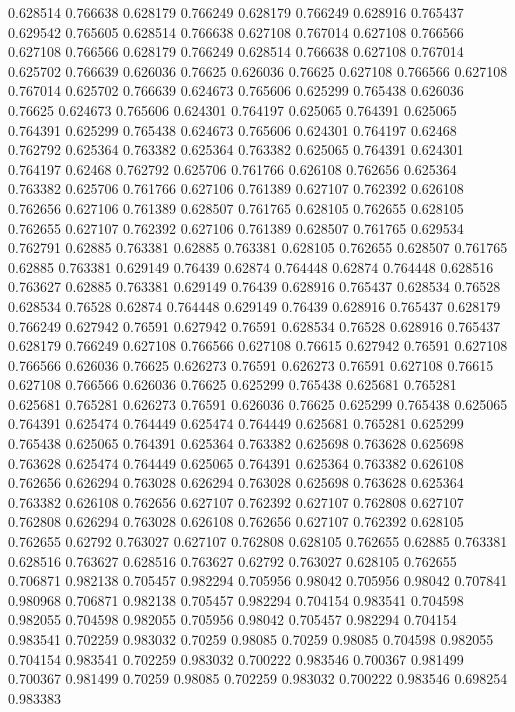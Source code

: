 0.628514 0.766638
0.628179 0.766249
0.628179 0.766249
0.628916 0.765437
0.629542 0.765605
0.628514 0.766638
0.627108 0.767014
0.627108 0.766566
0.627108 0.766566
0.628179 0.766249
0.628514 0.766638
0.627108 0.767014
0.625702 0.766639
0.626036 0.76625
0.626036 0.76625
0.627108 0.766566
0.627108 0.767014
0.625702 0.766639
0.624673 0.765606
0.625299 0.765438
0.626036 0.76625
0.624673 0.765606
0.624301 0.764197
0.625065 0.764391
0.625065 0.764391
0.625299 0.765438
0.624673 0.765606
0.624301 0.764197
0.62468 0.762792
0.625364 0.763382
0.625364 0.763382
0.625065 0.764391
0.624301 0.764197
0.62468 0.762792
0.625706 0.761766
0.626108 0.762656
0.625364 0.763382
0.625706 0.761766
0.627106 0.761389
0.627107 0.762392
0.626108 0.762656
0.627106 0.761389
0.628507 0.761765
0.628105 0.762655
0.628105 0.762655
0.627107 0.762392
0.627106 0.761389
0.628507 0.761765
0.629534 0.762791
0.62885 0.763381
0.62885 0.763381
0.628105 0.762655
0.628507 0.761765
0.62885 0.763381
0.629149 0.76439
0.62874 0.764448
0.62874 0.764448
0.628516 0.763627
0.62885 0.763381
0.629149 0.76439
0.628916 0.765437
0.628534 0.76528
0.628534 0.76528
0.62874 0.764448
0.629149 0.76439
0.628916 0.765437
0.628179 0.766249
0.627942 0.76591
0.627942 0.76591
0.628534 0.76528
0.628916 0.765437
0.628179 0.766249
0.627108 0.766566
0.627108 0.76615
0.627942 0.76591
0.627108 0.766566
0.626036 0.76625
0.626273 0.76591
0.626273 0.76591
0.627108 0.76615
0.627108 0.766566
0.626036 0.76625
0.625299 0.765438
0.625681 0.765281
0.625681 0.765281
0.626273 0.76591
0.626036 0.76625
0.625299 0.765438
0.625065 0.764391
0.625474 0.764449
0.625474 0.764449
0.625681 0.765281
0.625299 0.765438
0.625065 0.764391
0.625364 0.763382
0.625698 0.763628
0.625698 0.763628
0.625474 0.764449
0.625065 0.764391
0.625364 0.763382
0.626108 0.762656
0.626294 0.763028
0.626294 0.763028
0.625698 0.763628
0.625364 0.763382
0.626108 0.762656
0.627107 0.762392
0.627107 0.762808
0.627107 0.762808
0.626294 0.763028
0.626108 0.762656
0.627107 0.762392
0.628105 0.762655
0.62792 0.763027
0.627107 0.762808
0.628105 0.762655
0.62885 0.763381
0.628516 0.763627
0.628516 0.763627
0.62792 0.763027
0.628105 0.762655
0.706871 0.982138
0.705457 0.982294
0.705956 0.98042
0.705956 0.98042
0.707841 0.980968
0.706871 0.982138
0.705457 0.982294
0.704154 0.983541
0.704598 0.982055
0.704598 0.982055
0.705956 0.98042
0.705457 0.982294
0.704154 0.983541
0.702259 0.983032
0.70259 0.98085
0.70259 0.98085
0.704598 0.982055
0.704154 0.983541
0.702259 0.983032
0.700222 0.983546
0.700367 0.981499
0.700367 0.981499
0.70259 0.98085
0.702259 0.983032
0.700222 0.983546
0.698254 0.983383
